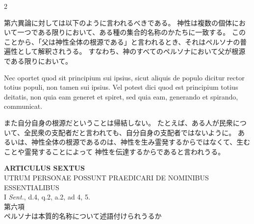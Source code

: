 \documentclass[paper=a4paper,fontsize=10pt,jafontsize=9pt,titlepage]{jlreq}
\begin{document}
\begin{paracol}{2}
\switchcolumn

第六異論に対しては以下のように言われるべきである。
神性は複数の個体において一つである限りにおいて、ある種の集合的名称のかたちに一致する。
このことから、「父は神性全体の根源である」と言われるとき、それはペルソナの普遍性として解釈されうる。
すなわち、神のすべてのペルソナにおいて父が根源である限りにおいて。

\switchcolumn*

Nec oportet quod
sit principium sui ipsius, sicut aliquis de populo dicitur rector totius
populi, non tamen sui ipsius. Vel potest dici quod est principium totius
deitatis, non quia eam generet et spiret, sed quia eam, generando et spirando,
communicat.

\switchcolumn

また自分自身の根源だということは帰結しない。
たとえば、ある人が民衆について、全民衆の支配者だと言われても、自分自身の支配者ではないように。
あるいは、神性全体の根源であるのは、神性を生み霊発するからではなくて、生むことや霊発することによって
神性を伝達するからであると言われうる。

\switchcolumn*

\end{paracol}
\newpage


\begin{center}
 {\Large {\bfseries ARTICULUS SEXTUS}}\\
 {\large UTRUM PERSONAE POSSUNT PRAEDICARI DE NOMINIBUS ESSENTIALIBUS}\\
 {\footnotesize I \textit{Sent.}, d.4, q.2, a.2, ad 4, 5.}\\
 {\Large 第六項\\ペルソナは本質的名称について述語付けられうるか}
\end{center}
\end{document}
